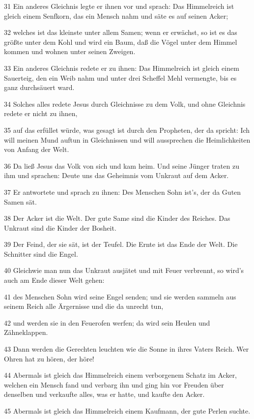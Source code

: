 \par 31 Ein anderes Gleichnis legte er ihnen vor und sprach: Das Himmelreich ist gleich einem Senfkorn, das ein Mensch nahm und säte es auf seinen Acker;
\par 32 welches ist das kleinste unter allem Samen; wenn er erwächst, so ist es das größte unter dem Kohl und wird ein Baum, daß die Vögel unter dem Himmel kommen und wohnen unter seinen Zweigen.
\par 33 Ein anderes Gleichnis redete er zu ihnen: Das Himmelreich ist gleich einem Sauerteig, den ein Weib nahm und unter drei Scheffel Mehl vermengte, bis es ganz durchsäuert ward.
\par 34 Solches alles redete Jesus durch Gleichnisse zu dem Volk, und ohne Gleichnis redete er nicht zu ihnen,
\par 35 auf das erfüllet würde, was gesagt ist durch den Propheten, der da spricht: Ich will meinen Mund auftun in Gleichnissen und will aussprechen die Heimlichkeiten von Anfang der Welt.
\par 36 Da ließ Jesus das Volk von sich und kam heim. Und seine Jünger traten zu ihm und sprachen: Deute uns das Geheimnis vom Unkraut auf dem Acker.
\par 37 Er antwortete und sprach zu ihnen: Des Menschen Sohn ist's, der da Guten Samen sät.
\par 38 Der Acker ist die Welt. Der gute Same sind die Kinder des Reiches. Das Unkraut sind die Kinder der Bosheit.
\par 39 Der Feind, der sie sät, ist der Teufel. Die Ernte ist das Ende der Welt. Die Schnitter sind die Engel.
\par 40 Gleichwie man nun das Unkraut ausjätet und mit Feuer verbrennt, so wird's auch am Ende dieser Welt gehen:
\par 41 des Menschen Sohn wird seine Engel senden; und sie werden sammeln aus seinem Reich alle Ärgernisse und die da unrecht tun,
\par 42 und werden sie in den Feuerofen werfen; da wird sein Heulen und Zähneklappen.
\par 43 Dann werden die Gerechten leuchten wie die Sonne in ihres Vaters Reich. Wer Ohren hat zu hören, der höre!
\par 44 Abermals ist gleich das Himmelreich einem verborgenem Schatz im Acker, welchen ein Mensch fand und verbarg ihn und ging hin vor Freuden über denselben und verkaufte alles, was er hatte, und kaufte den Acker.
\par 45 Abermals ist gleich das Himmelreich einem Kaufmann, der gute Perlen suchte.
